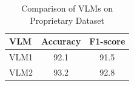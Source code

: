 \documentclass{article}
\begin{document}
        \begin{table}[h]
        \centering
        \begin{tabular}{|l|c|c|}
        \hline
        \textbf{VLM} & \textbf{Accuracy} & \textbf{F1-score} \\
        \hline
        VLM1 & 92.1 & 91.5 \\
        VLM2 & 93.2 & 92.8 \\
        \hline
        \end{tabular}
        \caption{Comparison of VLMs on Proprietary Dataset}
        \label{tab:vlm-comparison-proprietary}
        \end{table}

        
        

        
\end{document}

